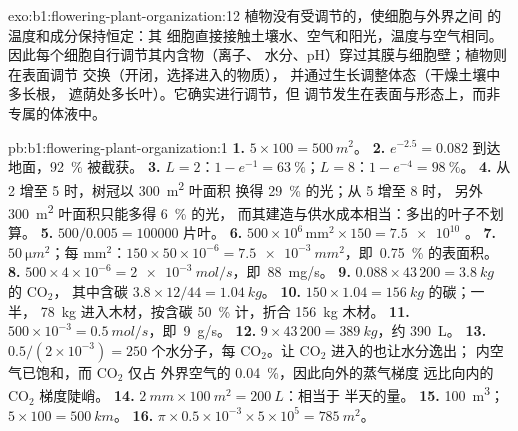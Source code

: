 \begin{solution}{exo:b1:flowering-plant-organization:12}
植物没有受调节的，使细胞与外界之间
的温度和成分保持恒定：其
细胞直接接触土壤水、空气和阳光，温度与空气相同。
因此每个细胞自行调节其内含物（离子、
水分、pH）穿过其膜与细胞壁；植物则在表面调节
交换（开闭，选择进入的物质），
并通过生长调整体态（干燥土壤中多长根，
遮荫处多长叶）。它确实进行调节，但
调节发生在表面与形态上，而非专属的体液中。
\end{solution}

\begin{solution}{pb:b1:flowering-plant-organization:1}
\textbf{1.} $5\times 100 = \qty{500}{m^2}$。
\textbf{2.} $e^{-2.5} = 0.082$ 到达地面，\qty{92}{\%}
被截获。
\textbf{3.} $L = 2$：$1 - e^{-1} = \qty{63}{\%}$；$L = 8$：$1 -
e^{-4} = \qty{98}{\%}$。
\textbf{4.} 从 2 增至 5 时，树冠以 \qty{300}{m^2} 叶面积
换得 \qty{29}{\%} 的光；从 5 增至 8 时，
另外 \qty{300}{m^2} 叶面积只能多得 \qty{6}{\%} 的光，
而其建造与供水成本相当：多出的叶子不划算。
\textbf{5.} $500/0.005 = \num{100000}$ 片叶。
\textbf{6.} $500\times 10^6\,\mathrm{mm^2}\times 150 = \num{7.5e10}$
。
\textbf{7.} $\qty{50}{\micro m^2}$；每 mm$^2$：$150\times 50\times
10^{-6} = \qty{7.5e-3}{mm^2}$，即\ \qty{0.75}{\%} 的表面积。
\textbf{8.} $500\times 4\times 10^{-6} = \qty{2e-3}{mol/s}$，即\
\qty{88}{mg/s}。
\textbf{9.} $0.088\times 43\,200 = \qty{3.8}{kg}$ 的 $\mathrm{CO_2}$，
其中含碳 $3.8\times 12/44 = \qty{1.04}{kg}$。
\textbf{10.} $150\times 1.04 = \qty{156}{kg}$ 的碳；一半，
\qty{78}{kg} 进入木材，按含碳 \qty{50}{\%} 计，折合 \qty{156}{kg} 木材。
\textbf{11.} $500\times 10^{-3} = \qty{0.5}{mol/s}$，即\ \qty{9}{g/s}。
\textbf{12.} $9\times 43\,200 = \qty{389}{kg}$，约 \qty{390}{L}。
\textbf{13.} $0.5/(2\times 10^{-3}) = 250$ 个水分子，每
$\mathrm{CO_2}$。让 $\mathrm{CO_2}$ 进入的也让水分逸出；
\omterm{def:b1:flowering-plant-organization:tissues}{气孔}内空气已饱和，而 $\mathrm{CO_2}$ 仅占
外界空气的 \qty{0.04}{\%}，因此向外的蒸气梯度
远比向内的 $\mathrm{CO_2}$ 梯度陡峭。
\textbf{14.} $\qty{2}{mm}\times\qty{100}{m^2} = \qty{200}{L}$：相当于
半天的量。
\textbf{15.} \qty{100}{m^3}；$5\times 100 = \qty{500}{km}$。
\textbf{16.} $\pi\times 0.5\times 10^{-3}\times 5\times 10^5 =
\qty{785}{m^2}$。

\end{solution}
